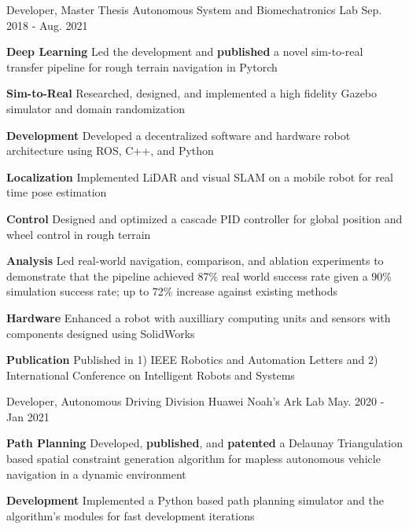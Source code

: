 \begin{cventries}
	\cventry
	{Developer, Master Thesis}
	{Autonomous System and Biomechatronics Lab}
	{Sep. 2018 - Aug. 2021}
	{}
	{
		\begin{cvitems}
			\item {
				\textbf{Deep Learning} Led the development and \textbf{published} a novel sim-to-real transfer pipeline for rough terrain navigation in Pytorch
			}
			\item {
				\textbf{Sim-to-Real} Researched, designed, and implemented a high fidelity Gazebo simulator and domain randomization
			}
			\item {
				\textbf{Development} Developed a decentralized software and hardware robot architecture using ROS, C++, and Python
			}
			\item {
				\textbf{Localization} Implemented LiDAR and visual SLAM on a mobile robot for real time pose estimation
			}
			\item {
				\textbf{Control} Designed and optimized a cascade PID controller for global position and wheel control in rough terrain
			}
			\item {
				\textbf{Analysis} Led real-world navigation, comparison, and ablation experiments to demonstrate that the pipeline achieved 87\% real world success rate given a 90\% simulation success rate; up to 72\% increase against existing methods
			}
			\item {
				\textbf{Hardware} Enhanced a robot with auxilliary computing units and sensors with components designed using SolidWorks
			}
			\item {
				\textbf{Publication} Published in 1) IEEE Robotics and Automation Letters and 2) International Conference on Intelligent Robots and Systems
			}
		\end{cvitems}
	}
	\cventry
	{Developer, Autonomous Driving Division}
	{Huawei Noah’s Ark Lab}
	{May. 2020 - Jan 2021}
	{}
	{
		\begin{cvitems}
			\item {
				\textbf{Path Planning} Developed, \textbf{published}, and \textbf{patented} a Delaunay Triangulation based spatial constraint generation algorithm for mapless autonomous vehicle navigation in a dynamic environment
			}
			\item {
				\textbf{Development} Implemented a Python based path planning simulator and the algorithm's modules for fast development iterations
			}
			\item {
}
\end{cvitems}}
\end{cventries}
